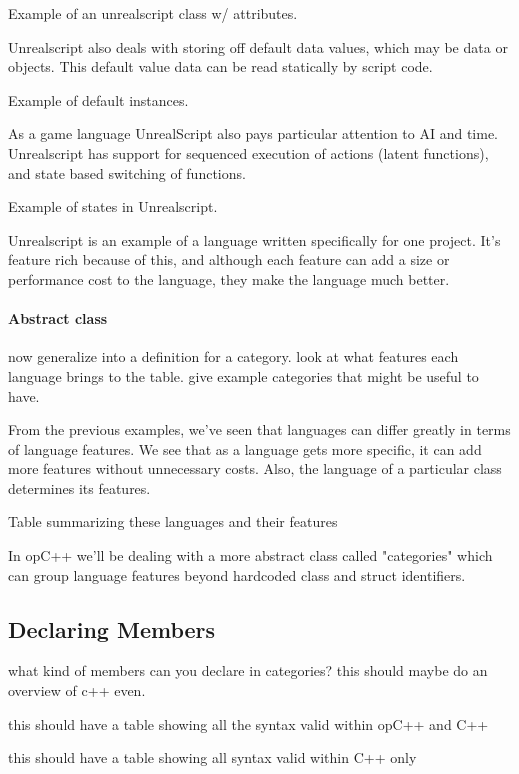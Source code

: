 Example of an unrealscript class w/ attributes.

Unrealscript also deals with storing off default data values, which may be data or objects.  This default value
data can be read statically by script code.

Example of default instances.

As a game language UnrealScript also pays particular attention to AI and time.  Unrealscript has
support for sequenced execution of actions (latent functions), and state based switching
of functions.

Example of states in Unrealscript.

Unrealscript is an example of a language written specifically for one project.  It's feature
rich because of this, and although each feature can add a size or performance cost to the language, 
they make the language much better.

\paragraph{Abstract class}

now generalize into a definition for a category.
look at what features each language brings to the table.
give example categories that might be useful to have.

From the previous examples, we've seen that languages can differ 
greatly in terms of language features.  We see that as a language
gets more specific, it can add more features without unnecessary costs.
Also, the language of a particular class determines its features.

Table summarizing these languages and their features

In opC++ we'll be dealing with a more abstract class called "categories" which
can group language features beyond hardcoded class and struct identifiers.

\subsection{ Declaring Members }
\label{sec:concepts_members}

what kind of members can you declare in categories?
this should maybe do an overview of c++ even.

this should have a table showing all the syntax valid within opC++ and C++

this should have a table showing all syntax valid within C++ only

